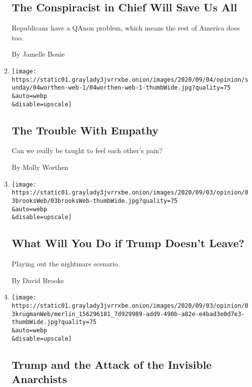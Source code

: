 \begin{enumerate}
  \hypertarget{the-conspiracist-in-chief-will-save-us-all}{%
  \subsection{The Conspiracist in Chief Will Save Us
  All}\label{the-conspiracist-in-chief-will-save-us-all}}

  Republicans have a QAnon problem, which means the rest of America does
  too.

  By Jamelle Bouie
\item
  \href{/2020/09/04/opinion/sunday/empathy-school-college.html}{}

  \texttt{[image: https://static01.graylady3jvrrxbe.onion/images/2020/09/04/opinion/sunday/04worthen-web-1/04worthen-web-1-thumbWide.jpg?quality=75\\\&auto=webp\\\&disable=upscale]}

  \hypertarget{the-trouble-with-empathy}{%
  \subsection{The Trouble With Empathy}\label{the-trouble-with-empathy}}

  Can we really be taught to feel each other's pain?

  By Molly Worthen
\item
  \href{/2020/09/03/opinion/trump-election-2020.html}{}

  \texttt{[image: https://static01.graylady3jvrrxbe.onion/images/2020/09/03/opinion/03brooksWeb/03brooksWeb-thumbWide.jpg?quality=75\\\&auto=webp\\\&disable=upscale]}

  \hypertarget{what-will-you-do-if-trump-doesnt-leave}{%
  \subsection{What Will You Do if Trump Doesn't
  Leave?}\label{what-will-you-do-if-trump-doesnt-leave}}

  Playing out the nightmare scenario.

  By David Brooks
\item
  \href{/2020/09/03/opinion/trump-democrats-cities.html}{}

  \texttt{[image: https://static01.graylady3jvrrxbe.onion/images/2020/09/03/opinion/03krugmanWeb/merlin\_156296181\_7d929989-add9-490b-a82e-e4bad3e0d7e3-thumbWide.jpg?quality=75\\\&auto=webp\\\&disable=upscale]}

  \hypertarget{trump-and-the-attack-of-the-invisible-anarchists}{%
  \subsection{Trump and the Attack of the Invisible
  Anarchists}\label{trump-and-the-attack-of-the-invisible-anarchists}}


\end{enumerate}
